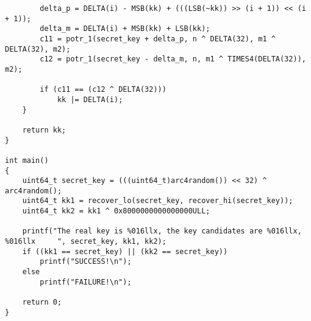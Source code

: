 \begin{verbatim}
		delta_p = DELTA(i) - MSB(kk) + (((LSB(~kk)) >> (i + 1)) << (i + 1));
		delta_m = DELTA(i) + MSB(kk) + LSB(kk);
		c11 = potr_1(secret_key + delta_p, n ^ DELTA(32), m1 ^ DELTA(32), m2);
		c12 = potr_1(secret_key - delta_m, n, m1 ^ TIMES4(DELTA(32)), m2);

		if (c11 == (c12 ^ DELTA(32)))
			kk |= DELTA(i);
	}

	return kk;
}

int main()
{
	uint64_t secret_key = (((uint64_t)arc4random()) << 32) ^ arc4random();
	uint64_t kk1 = recover_lo(secret_key, recover_hi(secret_key));
	uint64_t kk2 = kk1 ^ 0x8000000000000000ULL;

	printf("The real key is %016llx, the key candidates are %016llx, %016llx     ", secret_key, kk1, kk2);
	if ((kk1 == secret_key) || (kk2 == secret_key))
		printf("SUCCESS!\n");
	else
		printf("FAILURE!\n");

	return 0;
}
\end{verbatim}

\renewcommand\thesection{\arabic{section}}
